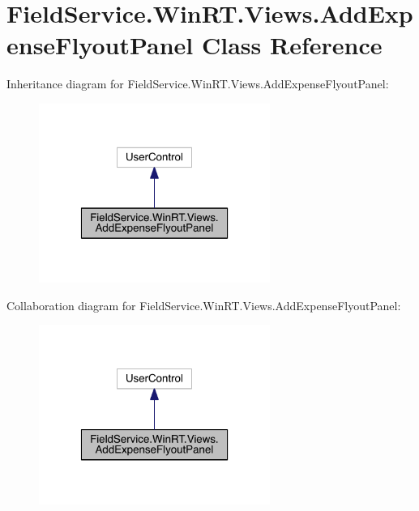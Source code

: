 \hypertarget{class_field_service_1_1_win_r_t_1_1_views_1_1_add_expense_flyout_panel}{\section{Field\+Service.\+Win\+R\+T.\+Views.\+Add\+Expense\+Flyout\+Panel Class Reference}
\label{class_field_service_1_1_win_r_t_1_1_views_1_1_add_expense_flyout_panel}
}


Inheritance diagram for Field\+Service.\+Win\+R\+T.\+Views.\+Add\+Expense\+Flyout\+Panel\+:
\nopagebreak
\begin{figure}[H]
\begin{center}
\leavevmode
\includegraphics[width=214pt]{class_field_service_1_1_win_r_t_1_1_views_1_1_add_expense_flyout_panel__inherit__graph}
\end{center}
\end{figure}


Collaboration diagram for Field\+Service.\+Win\+R\+T.\+Views.\+Add\+Expense\+Flyout\+Panel\+:
\nopagebreak
\begin{figure}[H]
\begin{center}
\leavevmode
\includegraphics[width=214pt]{class_field_service_1_1_win_r_t_1_1_views_1_1_add_expense_flyout_panel__coll__graph}
\end{center}
\end{figure}
